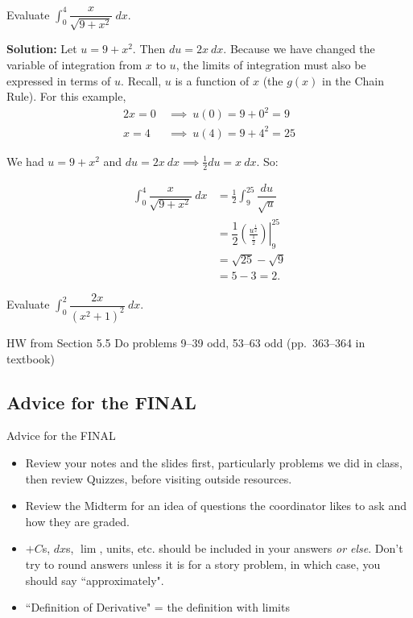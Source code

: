 \documentclass[14pt]{beamer}
\newcommand{\dint}{\displaystyle\int}
\begin{document}
\begin{frame}{}
\footnotesize
\begin{ex} Evaluate $\dint_0^4 \dfrac{x}{\sqrt{9+x^2}}\ dx.$ \end{ex}

{\bf Solution:} Let $u=9+x^2$.  Then $du=2x\ dx$.  Because we have changed the variable of integration from $x$ to $u$, the limits of integration must also be expressed in terms of $u$.  Recall, $u$ is a function of $x$ (the $g(x)$ in the Chain Rule). For this example,
\begin{alignat*}{2}
x=0\ &\implies\ u(0) = 9+0^2 = 9 \\
x=4\ &\implies\ u(4) = 9+4^2 = 25 
\end{alignat*}
\end{frame}

\begin{frame}
\small
We had $u=9+x^2$ and $du=2x\ dx \implies \frac{1}{2}du=x\ dx$. So:

\begin{align*}
\dint_0^4 \dfrac{x}{\sqrt{9+x^2}}\ dx &= \frac{1}{2}\dint_{9}^{25} \dfrac{du}{\sqrt{u}} \\[0.5pc]
 &= \dfrac{1}{2} \left. \left(\frac{u^{\frac{1}{2}}}{\frac{1}{2}} \right) \right\vert_{9}^{25} \\[0.5pc]
 &= \sqrt{25}-\sqrt{9} \\[0.5pc]
 &= 5-3=2.
\end{align*}
\end{frame}

\begin{frame}%
\small
\begin{exe} Evaluate $\dint_0^2 \dfrac{2x}{(x^2+1)^2}\ dx.$ \end{exe}
\end{frame}

\begin{frame}{HW from Section 5.5}
Do problems 9--39 odd, 53--63 odd (pp.\ 363--364 in textbook)
\end{frame}

\subsection[Advice for the FINAL]{Advice for the FINAL}

\begin{frame}{Advice for the FINAL}
\footnotesize
\begin{itemize}
\item Review your notes and the slides first, particularly problems we did in class, then review Quizzes, before visiting outside resources.
\item Review the Midterm for an idea of questions the coordinator likes to ask and how they are graded.
\item $+C$s, $dx$s, $\lim$, units, etc. should be included in your answers {\it or else}.  Don't try to round answers unless it is for a story problem, in which case, you should say ``approximately".
\item ``Definition of Derivative" = the definition with limits
\end{itemize}
\end{frame}
\end{document}
